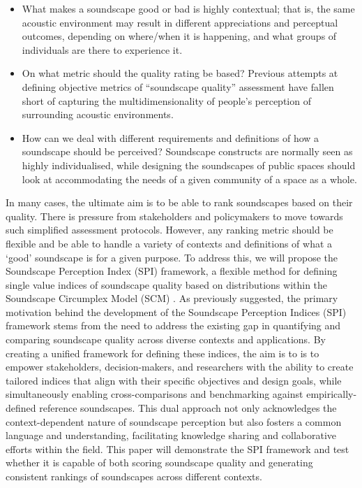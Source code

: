 \documentclass[
  authoryear,
  preprint,
  1p]{elsarticle}
\providecommand{\tightlist}{%
  \setlength{\itemsep}{0pt}\setlength{\parskip}{0pt}}\usepackage{longtable,booktabs,array}
\begin{document}
\begin{itemize}
\tightlist
\item
  What makes a soundscape good or bad is highly contextual; that is, the
  same acoustic environment may result in different appreciations and
  perceptual outcomes, depending on where/when it is happening, and what
  groups of individuals are there to experience it.
\item
  On what metric should the quality rating be based? Previous attempts
  at defining objective metrics of ``soundscape quality'' assessment
  have fallen short of capturing the multidimensionality of people's
  perception of surrounding acoustic environments.
\item
  How can we deal with different requirements and definitions of how a
  soundscape should be perceived? Soundscape constructs are normally
  seen as highly individualised, while designing the soundscapes of
  public spaces should look at accommodating the needs of a given
  community of a space as a whole.
\end{itemize}

In many cases, the ultimate aim is to be able to rank soundscapes based
on their quality. There is pressure from stakeholders and policymakers
to move towards such simplified assessment protocols. However, any
ranking metric should be flexible and be able to handle a variety of
contexts and definitions of what a `good' soundscape is for a given
purpose. To address this, we will propose the Soundscape Perception
Index (SPI) framework, a flexible method for defining single value
indices of soundscape quality based on distributions within the
Soundscape Circumplex Model (SCM)
\citep{Axelsson2012Swedish, Mitchell2022How, Axelsson2010principal}. As
previously suggested, the primary motivation behind the development of
the Soundscape Perception Indices (SPI) framework stems from the need to
address the existing gap in quantifying and comparing soundscape quality
across diverse contexts and applications. By creating a unified
framework for defining these indices, the aim is to is to empower
stakeholders, decision-makers, and researchers with the ability to
create tailored indices that align with their specific objectives and
design goals, while simultaneously enabling cross-comparisons and
benchmarking against empirically-defined reference soundscapes. This
dual approach not only acknowledges the context-dependent nature of
soundscape perception but also fosters a common language and
understanding, facilitating knowledge sharing and collaborative efforts
within the field. This paper will demonstrate the SPI framework and test
whether it is capable of both scoring soundscape quality and generating
consistent rankings of soundscapes across different contexts.
\end{document}
